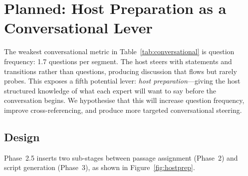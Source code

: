 \documentclass[final]{clv2025}
\begin{document}
\section{Planned: Host Preparation as a Conversational Lever}
\label{sec:host-prep}

The weakest conversational metric in Table~\ref{tab:conversational}
is question frequency: 1.7 questions per segment.  The host steers
with statements and transitions rather than questions, producing
discussion that flows but rarely probes.  This exposes a fifth
potential lever: \emph{host preparation}---giving the host structured
knowledge of what each expert will want to say before the conversation
begins.  We hypothesise that this will increase question frequency,
improve cross-referencing, and produce more targeted conversational
steering.

\subsection{Design}

Phase~2.5 inserts two sub-stages between passage assignment (Phase~2)
and script generation (Phase~3), as shown in
Figure~\ref{fig:hostprep}.
\end{document}
